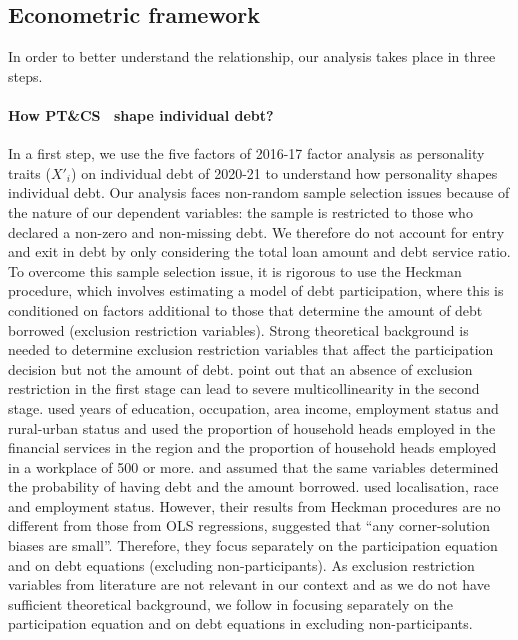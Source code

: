 \documentclass[a4paper, 11pt, onecolumn]{article}
\newcommand{\PTCS}{PT\&CS}
\begin{document}
	\subsection{Econometric framework}
	\label{subsection:econometricframework}

In order to better understand the relationship, our analysis takes place in three steps.
\paragraph{How \PTCS~ shape individual debt?}
In a first step, we use the five factors of 2016-17 factor analysis as personality traits ($X'_{i}$) on individual debt of 2020-21 to understand how personality shapes individual debt.
Our analysis faces non-random sample selection issues because of the nature of our dependent variables: the sample is restricted to those who declared a non-zero and non-missing debt.
We therefore do not account for entry and exit in debt by only considering the total loan amount and debt service ratio.
To overcome this sample selection issue, it is rigorous to use the Heckman procedure, which involves estimating a model of debt participation, where this is conditioned on factors additional to those that determine the amount of debt borrowed (exclusion restriction variables).
Strong theoretical background is needed to determine exclusion restriction variables that affect the participation decision but not the amount of debt.
\cite{Lennox2011} point out that an absence of exclusion restriction in the first stage can lead to severe multicollinearity in the second stage.
\cite{Cox1993} used years of education, occupation, area income, employment status and rural-urban status and \cite{Bertaut2002} used the proportion of household heads employed in the financial services in the region and the proportion of household heads employed in a workplace of 500 or more.
\cite{Duca1993} and \cite{Crook2001} assumed that the same variables determined the probability of having debt and the amount borrowed.
\cite{Rio2006} used localisation, race and employment status.
However, their results from Heckman procedures are no different from those from OLS regressions, suggested that ``any corner-solution biases are small''.
Therefore, they focus separately on the participation equation and on debt equations (excluding non-participants).
As exclusion restriction variables from literature are not relevant in our context and as we do not have sufficient theoretical background, we follow \cite{Rio2006} in focusing separately on the participation equation and on debt equations in excluding non-participants.
\end{document}
